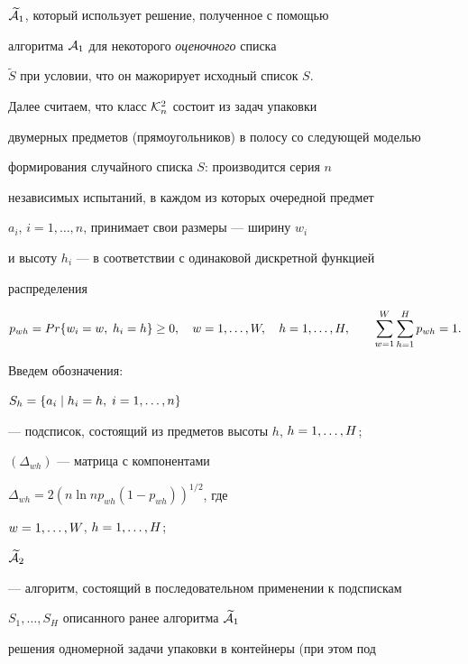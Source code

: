 $\widetilde {\cal A}_{1}$, который использует решение, полученное с помощью 


алгоритма ${\cal A}_{1}$ для некоторого {\em оценочного} списка 


$\widetilde S$ при условии, что он мажорирует исходный список $S$.





Далее считаем, что класс ${\cal K}_{n}^{2}$ состоит из задач упаковки 


двумерных предметов (прямоугольников) в полосу со следующей моделью 


формирования случайного списка $S$: производится серия $n$ 


независимых испытаний, в каждом из которых очередной предмет 


$a_{i}$, $i=1,\dotsc,n$, принимает свои размеры --- ширину $w_{i}$ 


и высоту $h_{i}$ --- в соответствии с одинаковой дискретной функцией 


распределения


$$


p_{wh}=Pr\{w_i=w,\; h_{i}=h\} \ge 0,\quad


\LW,\quad \LH,


\qquad


\SWH p_{wh}=1.


$$





Введем обозначения:





$S_{h} =\{a_{i}\mid h_{i}=h,\; i=1,\dotsc,n\}$


--- подсписок, состоящий из предметов высоты $h$, $h=1,\dotsc,H$;





$(\Delta_{wh})$ --- матрица с компонентами


$\Delta_{wh} = 2(n \ln n p_{wh}(1-p_{wh}))^{1/2}$, где


$w=1,\dotsc,W$, $h=1,\dotsc,H$;





$\widetilde {\cal A}_{2}$


--- алгоритм, состоящий в последовательном применении к подспискам


$S_{1},\dotsc,S_{H}$ описанного ранее алгоритма $\widetilde {\cal A}_{1}$


решения одномерной задачи упаковки в контейнеры (при этом под


